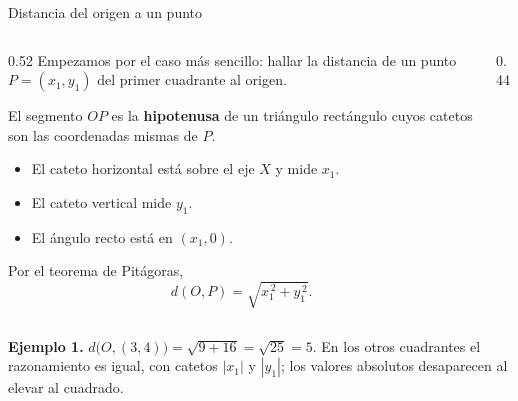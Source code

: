 \documentclass[aspectratio=169,10pt]{beamer}
\newcommand{\destaca}[1]{%
  \par\vspace{3pt}\noindent
  \colorbox{turquesaClaro}{%
    \parbox{\dimexpr\linewidth-2\fboxsep\relax}{\vspace{3pt}#1\vspace{3pt}}}%
  \par\vspace{3pt}}
\begin{document}
\begin{frame}{Distancia del origen a un punto}
  \begin{columns}[T]
    \begin{column}{0.52\textwidth}
      Empezamos por el caso más sencillo: hallar la distancia de un
      punto $P=(x_1,y_1)$ del primer cuadrante al origen.

      \vspace{0.15cm}
      El segmento $OP$ es la \textbf{hipotenusa}
      de un triángulo rectángulo cuyos catetos son las coordenadas
      mismas de $P$.

      \begin{itemize}
        \item El cateto horizontal está sobre el eje $X$ y mide $x_1$.
        \item El cateto vertical mide $y_1$.
        \item El ángulo recto está en $(x_1,0)$.
      \end{itemize}

      Por el teorema de Pitágoras,
      \vspace{-0.2cm}
      \[
        d(O,P)=\sqrt{x_1^{\,2}+y_1^{\,2}} .
      \]
    \end{column}
    \begin{column}{0.44\textwidth}
      \begin{center}
      \end{center}
    \end{column}
  \end{columns}

  \vspace{0.05cm}
  \destaca{\textbf{Ejemplo 1.} $d\bigl(O,(3,4)\bigr)=\sqrt{9+16}
  =\sqrt{25}=5$. En los otros cuadrantes el razonamiento es igual, con
  catetos $|x_1|$ y $|y_1|$; los valores absolutos desaparecen al
  elevar al cuadrado.}
\end{frame}
\end{document}
